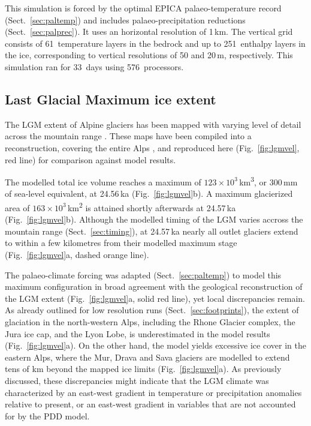 \documentclass[tc, manuscript]{copernicus}
\begin{document}
    This simulation is forced by the optimal EPICA palaeo-temperature record
    (Sect.~\ref{sec:paltemp}) and includes palaeo-precipitation reductions
    (Sect.~\ref{sec:palprec}). It uses an horizontal resolution of 1\,km. The
    vertical grid consists of 61~temperature layers in the bedrock and up to
    251~enthalpy layers in the ice, corresponding to vertical resolutions of 50
    and 20\,\unit{m}, respectively. This simulation ran for 33~days using
    576~processors.


\subsection{Last Glacial Maximum ice extent}
\label{sec:extent}

    The LGM extent of Alpine glaciers has been mapped with varying level of
    detail across the mountain range \citep{Penck.Bruckner.1909, Jackli.1962,
    Husen.1987, Bini.etal.2009, Husen.2011, Coutterand.2010, Bavec.Verbic.2011,
    Buoncristiani.Campy.2011}. These maps have been compiled
    into a reconstruction, covering the entire Alps \citep{Ehlers.etal.2011},
    and reproduced here (Fig.~\ref{fig:lgmvel}, red line) for comparison
    against model results.

    The modelled total ice volume reaches a maximum of $123 \times
    10^{3}$\,\unit{km^3}, or 300\,mm of sea-level equivalent, at 24.56\,ka
    (Fig.~\ref{fig:lgmvel}b). A maximum glacierized area of $163 \times
    10^{3}$\,\unit{km^2} is attained shortly afterwards at 24.57\,ka
    (Fig.~\ref{fig:lgmvel}b). Although the modelled timing of the LGM varies
    accross the mountain range (Sect.~\ref{sec:timing}), at 24.57\,ka nearly
    all outlet glaciers extend to within a few kilometres from their modelled
    maximum stage (Fig.~\ref{fig:lgmvel}a, dashed orange line).

    The palaeo-climate forcing was adapted (Sect.~\ref{sec:paltemp})
    to model this maximum configuration in broad agreement with the geological
    reconstruction of the LGM extent (Fig.~\ref{fig:lgmvel}a, solid red line),
    yet local discrepancies remain. As already outlined for low resolution
    runs (Sect.~\ref{sec:footprints}), the extent of glaciation in the
    north-western Alps, including the Rhone Glacier complex, the Jura ice cap,
    and the Lyon Lobe, is underestimated in the model results
    (Fig.~\ref{fig:lgmvel}a). On the other hand, the model yields excessive ice
    cover in the eastern Alps, where the Mur, Drava and Sava glaciers are
    modelled to extend tens of km beyond the mapped ice limits
    (Fig.~\ref{fig:lgmvel}a). As previously discussed, these discrepancies
    might indicate that the
    LGM climate was characterized by an east-west gradient in temperature
    \citep[cf.][]{Heyman.etal.2013} or precipitation
    \citep[cf.][]{Wu.etal.2007} anomalies relative to present, or an east-west
    gradient in variables that are not accounted for by the PDD model.
\end{document}
